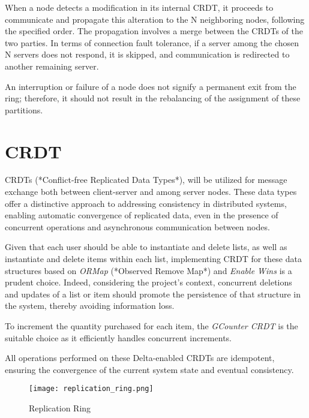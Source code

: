\documentclass[sigconf, authorversion, nonacm]{acmart}
\begin{document}
When a node detects a modification in its internal CRDT, it proceeds to communicate and propagate this alteration to the N neighboring nodes, following the specified order. The propagation involves a merge between the CRDTs of the two parties. In terms of connection fault tolerance, if a server among the chosen N servers does not respond, it is skipped, and communication is redirected to another remaining server.

An interruption or failure of a node does not signify a permanent exit from the ring; therefore, it should not result in the rebalancing of the assignment of these partitions.

\section{CRDT}

CRDTs (*Conflict-free Replicated Data Types*), will be utilized for message exchange both between client-server and among server nodes. These data types offer a distinctive approach to addressing consistency in distributed systems, enabling automatic convergence of replicated data, even in the presence of concurrent operations and asynchronous communication between nodes.

Given that each user should be able to instantiate and delete lists, as well as instantiate and delete items within each list, implementing CRDT for these data structures based on \textit{ORMap} (*Observed Remove Map*) and \textit{Enable Wins} is a prudent choice. Indeed, considering the project's context, concurrent deletions and updates of a list or item should promote the persistence of that structure in the system, thereby avoiding information loss.

To increment the quantity purchased for each item, the \textit{GCounter CRDT} is the suitable choice as it efficiently handles concurrent increments.

All operations performed on these Delta-enabled CRDTs \cite{deltaenabledcrdt} are idempotent, ensuring the convergence of the current system state and eventual consistency.


\begin{figure}[H]
    \centering
    \texttt{[image: replication\_ring.png]}
    \caption{Replication Ring}
    \label{fig:Replication Ring}
\end{figure}

\nocite{*}
\printbibliography

\clearpage

\appendix
\end{document}
